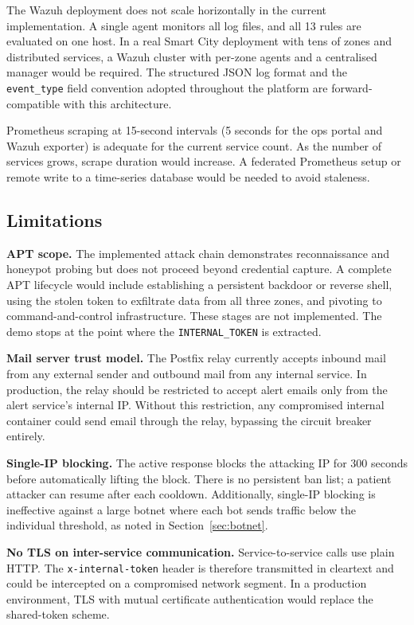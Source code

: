 The Wazuh deployment does not scale horizontally in the current implementation.
A single agent monitors all log files, and all 13 rules are evaluated on one
host. In a real Smart City deployment with tens of zones and distributed services,
a Wazuh cluster with per-zone agents and a centralised manager would be required.
The structured JSON log format and the \texttt{event\_type} field convention
adopted throughout the platform are forward-compatible with this architecture.

Prometheus scraping at 15-second intervals (5 seconds for the ops portal and Wazuh
exporter) is adequate for the current service count. As the number of services
grows, scrape duration would increase. A federated Prometheus setup or remote
write to a time-series database would be needed to avoid staleness.

\subsection{Limitations}

\textbf{APT scope.} The implemented attack chain demonstrates reconnaissance and
honeypot probing but does not proceed beyond credential capture. A complete APT
lifecycle would include establishing a persistent backdoor or reverse shell, using
the stolen token to exfiltrate data from all three zones, and pivoting to
command-and-control infrastructure. These stages are not implemented. The demo
stops at the point where the \texttt{INTERNAL\_TOKEN} is extracted.

\textbf{Mail server trust model.} The Postfix relay currently accepts inbound mail
from any external sender and outbound mail from any internal service. In production,
the relay should be restricted to accept alert emails only from the alert service's
internal IP. Without this restriction, any compromised internal container could
send email through the relay, bypassing the circuit breaker entirely.

\textbf{Single-IP blocking.} The active response blocks the attacking IP for 300
seconds before automatically lifting the block. There is no persistent ban list; a
patient attacker can resume after each cooldown. Additionally, single-IP blocking
is ineffective against a large botnet where each bot sends traffic below the
individual threshold, as noted in Section~\ref{sec:botnet}.

\textbf{No TLS on inter-service communication.} Service-to-service calls use
plain HTTP. The \texttt{x-internal-token} header is therefore transmitted in
cleartext and could be intercepted on a compromised network segment. In a
production environment, TLS with mutual certificate authentication would replace
the shared-token scheme.

